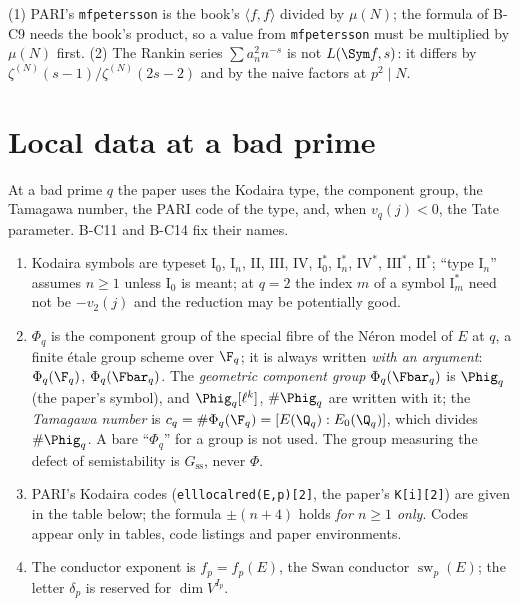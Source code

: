 \begin{warning}\label{warn:notation:normalisations}
(1) PARI's \texttt{mfpetersson} is the book's $\langle f,f\rangle$ divided by $\mu(N)$; the formula of B-C9 needs the book's product,
so a value from \texttt{mfpetersson} must be multiplied by $\mu(N)$ first. (2) The Rankin series $\sum a_n^2n^{-s}$ is not
$L(\Sym f,s)$: it differs by $\zeta^{(N)}(s-1)/\zeta^{(N)}(2s-2)$ and by the naive factors at $p^2\mid N$.
\end{warning}

\section{Local data at a bad prime}\label{sec:notation:local}

At a bad prime $q$ the paper uses the Kodaira type, the component group, the Tamagawa number, the PARI code of the type, and,
when $v_q(j)<0$, the Tate parameter. B-C11 and B-C14 fix their names.

\begin{convention}\label{conv:notation:bc11}
\leavevmode
\begin{enumerate}[label=(\alph*)]
\item Kodaira symbols are typeset $\mathrm I_0$, $\mathrm I_n$, $\mathrm{II}$, $\mathrm{III}$, $\mathrm{IV}$, $\mathrm I_0^*$, $\mathrm I_n^*$, $\mathrm{IV}^*$, $\mathrm{III}^*$, $\mathrm{II}^*$;
``type $\mathrm I_n$'' assumes $n\ge1$ unless $\mathrm I_0$ is meant; at $q=2$ the index $m$ of a symbol $\mathrm I_m^*$ need not be
$-v_2(j)$ and the reduction may be potentially good.
\item $\Phi_q$ is the component group of the special fibre of the N\'eron model of $E$ at $q$, a finite \'etale group scheme over
$\F_q$; it is always written \emph{with an argument}: $\Phi_q(\F_q)$, $\Phi_q(\Fbar_q)$. The \emph{geometric component group}
$\Phi_q(\Fbar_q)$ is $\Phig_q$ (the paper's symbol), and $\Phig_q[\ell^k]$, $\#\Phig_q$ are written with it; the \emph{Tamagawa number}
is $c_q=\#\Phi_q(\F_q)=[E(\Q_q):E_0(\Q_q)]$, which divides $\#\Phig_q$. A bare ``$\Phi_q$'' for a group is not used. The group measuring
the defect of semistability is $G_{\mathrm{ss}}$, never $\Phi$.
\item PARI's Kodaira codes (\texttt{elllocalred(E,p)[2]}, the paper's \texttt{K[i][2]}) are given in the table below; the formula
$\pm(n+4)$ holds \emph{for $n\ge1$ only}. Codes appear only in tables, code listings and paper environments.
\item The conductor exponent is $f_p=f_p(E)$, the Swan conductor $\operatorname{sw}_p(E)$; the letter $\delta_p$ is reserved for
$\dim V^{I_p}$.
\end{enumerate}
\end{convention}

